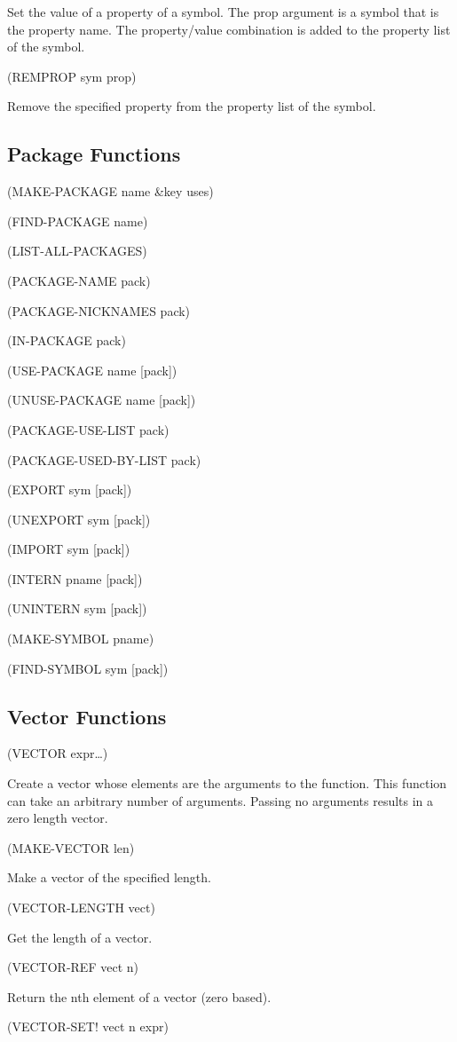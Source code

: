 \documentclass[11pt]{article}
\begin{document}
Set the value of a property of a symbol. The prop argument is a symbol
that is the property name. The property/value combination is added to
the property list of the symbol.

(REMPROP sym prop)

Remove the specified property from the property list of the symbol.
\subsection{Package Functions}
\label{sec-1-19}

(MAKE-PACKAGE name \&key uses)

(FIND-PACKAGE name)

(LIST-ALL-PACKAGES)

(PACKAGE-NAME pack)

(PACKAGE-NICKNAMES pack)

(IN-PACKAGE pack)

(USE-PACKAGE name [pack])

(UNUSE-PACKAGE name [pack])

(PACKAGE-USE-LIST pack)

(PACKAGE-USED-BY-LIST pack)

(EXPORT sym [pack])

(UNEXPORT sym [pack])

(IMPORT sym [pack])

(INTERN pname [pack])

(UNINTERN sym [pack])

(MAKE-SYMBOL pname)

(FIND-SYMBOL sym [pack])
\subsection{Vector Functions}
\label{sec-1-20}

(VECTOR expr\ldots{})

Create a vector whose elements are the arguments to the function. This
function can take an arbitrary number of arguments. Passing no arguments
results in a zero length vector.

(MAKE-VECTOR len)

Make a vector of the specified length.

(VECTOR-LENGTH vect)

Get the length of a vector.

(VECTOR-REF vect n)

Return the nth element of a vector (zero based).

(VECTOR-SET! vect n expr)
\end{document}
